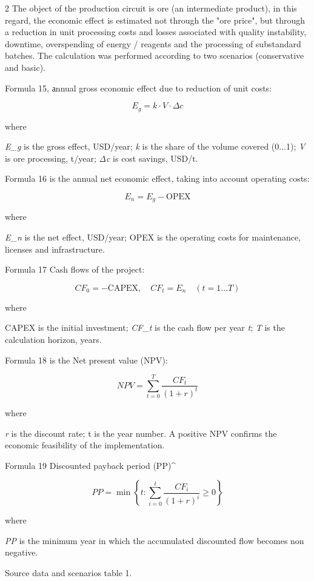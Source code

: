 \begin{multicols}{2}
The object of the production circuit is ore (an intermediate product),
in this regard, the economic effect is estimated not through the "ore
price", but through a reduction in unit processing costs and losses
associated with quality instability, downtime, overspending of energy /
reagents and the processing of substandard batches. The calculation was
performed according to two scenarios (conservative and basic).

Formula 15, аnnual gross economic effect due to reduction of unit costs:

\begin{equation}
E_{g} = k \cdot V \cdot \Delta c
\end{equation}

where

\emph{E\_g} is the gross effect, USD/year; \emph{k} is the share of the
volume covered (0...1); \emph{V} is ore processing, t/year; \emph{Δc} is
cost savings, USD/t.

Formula 16 is the annual net economic effect, taking into account
operating costs:

\begin{equation}
E_{n} = E_{g} - \text{OPEX}
\end{equation}

where

\emph{E\_n} is the net effect, USD/year; OPEX is the operating costs for
maintenance, licenses and infrastructure.

Formula 17 Cash flows of the project:

\begin{equation}
CF_{0} = -\text{CAPEX}, \quad CF_{t} = E_{n} \quad (t=1 \ldots T)
\end{equation}

where

CAPEX is the initial investment; \emph{CF\_t} is the cash flow per year
\emph{t}; \emph{T} is the calculation horizon, years.

Formula 18 is the Net present value (NPV):

\begin{equation}
NPV = \sum_{t=0}^{T} \frac{CF_{t}}{(1+r)^{t}}
\end{equation}

where

\emph{r} is the discount rate; t is the year number. A positive NPV
confirms the economic feasibility of the implementation.

Formula 19 Discounted payback period (PP)\^{}

\begin{equation}
PP = \min \left\{ t : \sum_{i=0}^{t} \frac{CF_{i}}{(1+r)^{i}} \geq 0 \right\}
\end{equation}

where

\emph{PP} is the minimum year in which the accumulated discounted flow
becomes non negative.

Source data and scenarios table 1.
\end{multicols}

